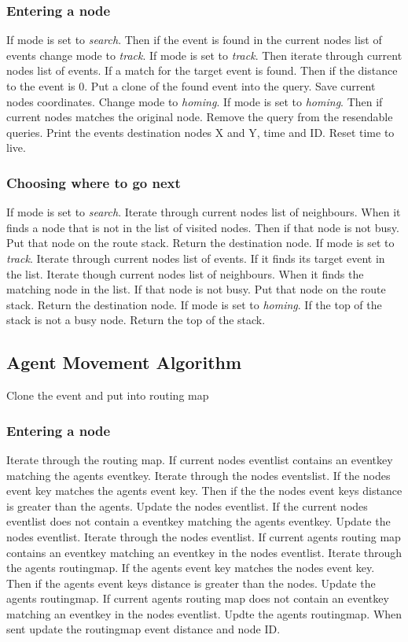 \documentclass[a4paper,11pt,twoside]{article}
\begin{document}
\subsubsection{Entering a node}
If mode is set to \textit{search}. Then if the event is found in the
current nodes list of events change mode to \textit{track}. If mode is
set to \textit{track}. Then iterate through current nodes list of
events. If a match for the target event is found. Then if the distance
to the event is 0. Put a clone of the found event into the query. Save
current nodes coordinates.  Change mode to \textit{homing}. If mode is
set to \textit{homing}. Then if current nodes matches the original
node. Remove the query from the resendable queries. Print the events
destination nodes X and Y, time and ID. Reset time to live.

\subsubsection{Choosing where to go next}
If mode is set to \textit{search}. Iterate through current nodes list
of neighbours.  When it finds a node that is not in the list of
visited nodes. Then if that node is not busy. Put that node on the
route stack. Return the destination node. If mode is set to
\textit{track}. Iterate through current nodes list of events. If it
finds its target event in the list. Iterate though current nodes
list of neighbours. When it finds the matching node in the list.  If
that node is not busy. Put that node on the route stack. Return the
destination node. If mode is set to \textit{homing}. If the top of the
stack is not a busy node. Return the top of the stack.

\subsection{Agent Movement Algorithm}
\noindent Clone the event and put into routing map

\subsubsection{Entering a node}
Iterate through the routing map. If current nodes eventlist contains
an eventkey matching the agents eventkey. Iterate through the nodes
eventslist. If the nodes event key matches the agents event key. Then
if the the nodes event keys distance is greater than the
agents. Update the nodes eventlist. If the current nodes eventlist
does not contain a eventkey matching the agents eventkey. Update the
nodes eventlist. Iterate through the nodes eventlist. If current
agents routing map contains an eventkey matching an eventkey in the
nodes eventlist.  Iterate through the agents routingmap.  If the
agents event key matches the nodes event key. Then if the agents event
keys distance is greater than the nodes. Update the agents
routingmap. If current agents routing map does not contain an eventkey
matching an eventkey in the nodes eventlist. Updte the agents
routingmap. When sent update the routingmap event distance and node
ID.
\end{document}
